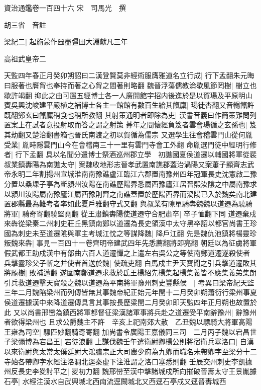資治通鑑卷一百四十六
宋　司馬光　撰

胡三省　音註

梁紀二|{
	起旃蒙作噩盡彊圉大淵獻凡三年}


高祖武皇帝二

天監四年春正月癸卯朔詔曰二漢登賢莫非經術服膺雅道名立行成|{
	行下孟翻朱元晦曰服著也膺胷也奉持而著之心胷之間著則略翻}
魏晉浮蕩儒教淪歇風節罔樹|{
	樹立也歇許竭翻}
抑此之由可置五經博士各一人廣開館宇招内後進於是以賀瑒及平原明山賓吳興沈峻建平嚴植之補博士各主一館館有數百生給其餼廩|{
	瑒徒杏翻又音暢餼許既翻鄭玄曰餼廩稍食也稍所教翻}
其射策通明者即除為吏|{
	漢書音義曰作簡策難問列置案上在試者意投射取而答之謂之射策}
朞年之間懷經負笈者雲會瑒循之玄孫也|{
	笈其劫翻又楚洽翻書箱也晉氏南渡之初以賀循為儒宗}
又選學生往會稽雲門山從何胤受業|{
	胤時隱雲門山今在會稽南三十一里有雲門寺會工外翻}
命胤選門徒中經明行修者|{
	行下孟翻}
具以名聞分遣博士祭酒巡州郡立學　初譙國夏侯道遷以輔國將軍從裴叔業鎮夀陽為南譙太守|{
	案魏收地形志晉孝武置南譙郡蓋治渦陽又案蕭子顯齊志武帝永明二年割揚州宣城淮南南豫譙盧江臨江六郡置南豫州四年冠軍長史沈憲啟二豫分置以桑堁子亭為斷潁州汝陽在南譙歷陽界悉屬西豫廬江居晉熙汝隂之中屬南豫求以潁川汝陽屬南豫廬江屬西豫則齊之南譙蓋置於歷陽西界而渦陽已入於魏矣南北建置郡縣最為難考者率如此夏戶雅翻守式又翻}
與叔業有隙單騎犇魏魏以道遷為驍騎將軍|{
	騎奇寄翻驍堅堯翻}
從王肅鎮夀陽使道遷守合肥肅卒|{
	卒子恤翻下同}
道遷棄戍來犇從梁秦二州刺史莊丘黑鎮南鄭以道遷為長史領漢中太守黑卒詔以都官尚書王珍國為刺史未至道遷隂與軍主考城江忱之等謀降魏|{
	降戶江翻}
先是魏仇池鎮將楊靈珍叛魏來犇|{
	事見一百四十一卷齊明帝建武四年先悉薦翻將即亮翻}
朝廷以為征虜將軍假武都王助戍漢中有部曲六百人道遷憚之上遣左右吳公之等使南鄭道遷遂殺使者兵擊靈珍父子斬之并使者首送於魏|{
	使疏吏翻}
白馬戍主尹天寶聞之引兵擊道遷敗其將龎樹|{
	敗補邁翻}
遂圍南鄭道遷求救於氐王楊紹先楊集起楊集義皆不應集義弟集朗引兵救道遷擊天寶殺之魏以道遷為平南將軍豫州刺史豐縣侯　|{
	考異曰梁帝紀天監三年二月魏陷梁州而列傳皆無其事魏帝紀正始元年閏十二月癸卯朔蕭衍行梁州事夏侯道遷據漢中來降道遷傳具言其事按長歷梁閏二月癸卯即天監四年正月朔也故置於此}
又以尚書邢巒為鎮西將軍都督征梁漢諸軍事將兵赴之道遷受平南辭豫州|{
	辭豫州者欲得梁州也}
且求公爵魏主不許　辛亥上祀南郊大赦　乙丑魏以驃騎大將軍高陽王雍為司空|{
	驃匹妙翻騎奇寄翻}
加尚書令廣陽王嘉儀同三司　二月丙子魏以宕昌世子梁彌博為宕昌王|{
	宕徒浪翻}
上謀伐魏壬午遣衛尉卿楊公則將宿衛兵塞洛口|{
	自漢以來衛尉與太常太僕廷尉大鴻臚宗正大司農少府為九卿而職名未帶卿字至梁分十二寺始各帶卿字水經注洛澗北逕秦虚下注淮謂之洛口塞悉則翻}
壬辰交州刺史李凱據州反長史李畟討平之|{
	畟初力翻}
魏邢巒至漢中擊諸城戍所向摧破晉夀太守王景胤據石亭|{
	水經注漢水自武興城北西南流逕闕城北又西逕石亭戍又逕晉夀城西}
